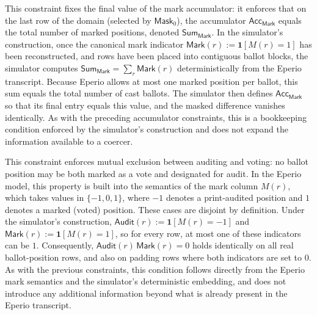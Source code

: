 This constraint fixes the final value of the mark accumulator: it enforces that on the last row of the domain (selected by
$\mathsf{Mask}_{0}$), the accumulator $\mathsf{Acc}_{\mathsf{Mark}}$ equals the total number of marked positions,
denoted $\mathsf{Sum}_{\mathsf{Mark}}$. In the simulator’s construction, once the canonical mark indicator
$\mathsf{Mark}(r):=\mathbf{1}[M(r)=1]$ has been reconstructed, and rows have been placed into contiguous ballot blocks,
the simulator computes $\mathsf{Sum}_{\mathsf{Mark}}=\sum_r \mathsf{Mark}(r)$ deterministically from the Eperio transcript.
Because Eperio allows at most one marked position per ballot, this sum equals the total number of cast ballots. The
simulator then defines $\mathsf{Acc}_{\mathsf{Mark}}$ so that its final entry equals this value, and the masked difference
vanishes identically. As with the preceding accumulator constraints, this is a bookkeeping condition enforced by the
simulator’s construction and does not expand the information available to a coercer.


This constraint enforces mutual exclusion between auditing and voting: no ballot position may be both marked as a vote and
designated for audit. In the Eperio model, this property is built into the semantics of the mark column $M(r)$, which takes
values in $\{-1,0,1\}$, where $-1$ denotes a print-audited position and $1$ denotes a marked (voted) position. These cases
are disjoint by definition. Under the simulator’s construction, $\mathsf{Audit}(r):=\mathbf{1}[M(r)=-1]$ and
$\mathsf{Mark}(r):=\mathbf{1}[M(r)=1]$, so for every row, at most one of these indicators can be $1$. Consequently,
$\mathsf{Audit}(r)\,\mathsf{Mark}(r)=0$ holds identically on all real ballot-position rows, and also on padding rows where
both indicators are set to $0$. As with the previous constraints, this condition follows directly from the Eperio mark
semantics and the simulator’s deterministic embedding, and does not introduce any additional information beyond what is
already present in the Eperio transcript.


